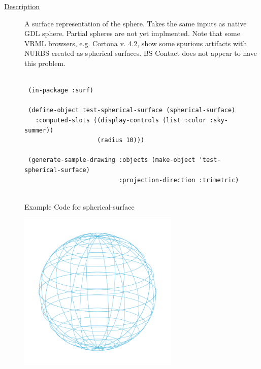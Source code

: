\documentclass [11pt]{book}
\begin{document}
\begin{itemize}
\begin{description}

\item [
\underline{Description}]


A surface representation of the sphere. Takes the same inputs as native GDL sphere. Partial spheres are not yet implmented.
Note that some VRML browsers, e.g. Cortona v. 4.2, show some spurious artifacts with NURBS 
created as spherical surfaces. BS Contact does not appear to have this problem.



\end{description}




\begin{figure}
\begin{lrbox}{\boxedverb}
\begin{minipage}{\linewidth}
{\small

\begin{verbatim}
                  
 (in-package :surf)

 (define-object test-spherical-surface (spherical-surface)
   :computed-slots ((display-controls (list :color :sky-summer))
                    (radius 10)))

 (generate-sample-drawing :objects (make-object 'test-spherical-surface)
                          :projection-direction :trimetric)


\end{verbatim}}
\end{minipage}
\end{lrbox}
\fbox{\usebox{\boxedverb}}

\caption{Example Code for spherical-surface}

\label{fig:example-code-spherical-surface}

\end{figure}

\begin{figure}
\begin{center}
\includegraphics[width=3in,height=3in]{../images/example-spherical-surface.pdf}
\end{center}


\end{figure}
\end{itemize}
\end{document}
